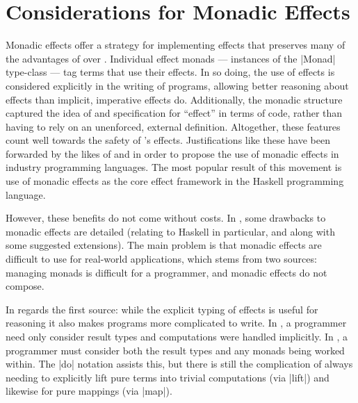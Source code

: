 \section{Considerations for Monadic Effects}
\label{sec:ME-considerations}

%
Monadic effects offer a strategy for implementing effects that preserves many of the advantages of \LangA over \LangB.
Individual effect monads --- instances of the \code|Monad| type-class --- tag terms that use their effects.
In so doing, the use of effects is considered explicitly in the writing of \LangC programs, allowing better reasoning about effects than implicit, imperative effects do.
Additionally, the monadic structure captured the idea of and specification for ``effect'' in terms of \LangC code, rather than having to rely on an unenforced, external definition.
Altogether, these features count well towards the safety of \LangC's effects.
Justifications like these have been forwarded by the likes of \cite{MOGGI199155} and \cite{Plotkin2001} in order to propose the use of monadic effects in industry programming languages.
The most popular result of this movement is use of monadic effects as the core effect framework in the Haskell programming language.

%
However, these benefits do not come without costs.
In \cite{peytonjones2001tackling}, some drawbacks to monadic effects are detailed (relating to Haskell in particular, and along with some suggested extensions).
The main problem is that monadic effects are difficult to use for real-world applications, which stems from two sources:
managing monads is difficult for a programmer, and
monadic effects do not compose.

In regards the first source:
while the explicit typing of effects is useful for reasoning
it also makes programs more complicated to write.
In \LangB, a programmer need only consider result types and computations were handled implicitly.
In \LangC, a programmer must consider both the result types and any monads being worked within.
The \code|do| notation assists this, but there is still the complication of always needing to explicitly lift pure terms into trivial computations (via \code|lift|) and likewise for pure mappings (via \code|map|).

